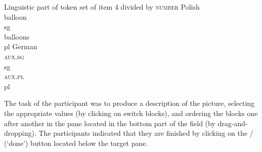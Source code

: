 \documentclass[output=paper]{langscibook}
\begin{document}
\ea Linguistic part of token set of item 4 divided by \textsc{number}\label{sim-dem:ex:window}
\ea Polish
\ea\gll {}  \\
\hspace{4pt}balloon \hspace{4pt}{him $\vert$ her} \\\hfill\textsf{sg}
\ex\gll {}  \\
\hspace{4pt}balloons \hspace{4pt}{him $\vert$ her} \\\hfill\textsf{pl}
\z
\ex German
\ea\gll {}   \\
\hspace{4pt}{the balloon $\vert$ a balloon} \hspace{4pt}\textsc{aux.sg} \hspace{4pt}{him $\vert$ her} \hspace{4pt}{flew.away}\\\hfill\textsf{sg}
\ex\gll {}  \hspace{.5cm} \\
\hspace{4pt}{the balloons $\vert$ balloons} \hspace{4pt}\textsc{aux.pl} \hspace{4pt}{him $\vert$ her} \hspace{4pt}{flew.away}\\\hfill\textsf{pl}
\z
\z\z

\noindent The task of the participant was to produce a description of the picture, selecting the appropriate values (by clicking on switch blocks), and ordering the blocks one after another in the pane located in the bottom part of the field (by drag-and-dropping). The participants indicated that they are finished by clicking on the  /  (`done') button located below the target pane.
\end{document}

